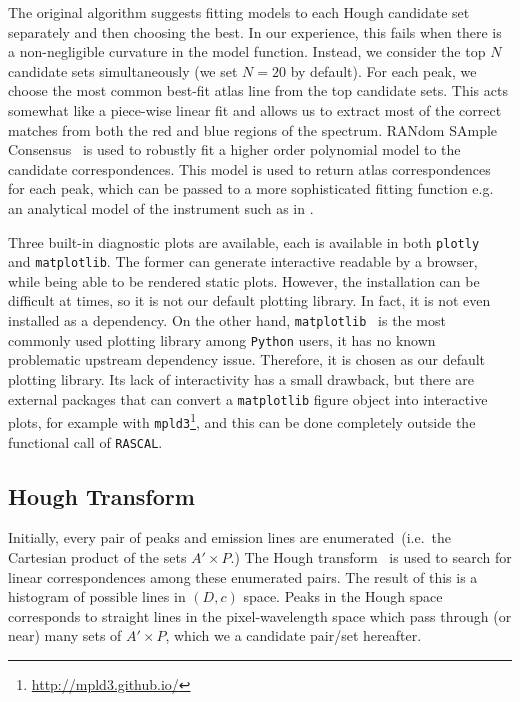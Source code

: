\documentclass{aa}
\begin{document}
The original algorithm suggests fitting models to each Hough candidate set separately
and then choosing the best. In our experience, this fails when there is a non-negligible
curvature in the model function. Instead, we consider the top $N$ candidate sets
simultaneously (we set $N = 20$ by default). For each peak, we choose the most common
best-fit atlas line from the top candidate sets. This acts somewhat like a piece-wise
linear fit and allows us to extract most of the correct matches from both the red and
blue regions of the spectrum. RANdom SAmple
Consensus~\citep[RANSAC][]{fischler_bolles_1981} is used to robustly fit
a higher order polynomial model to the candidate correspondences. This model is used
to return atlas correspondences for each peak, which can be passed to a more
sophisticated fitting function e.g. an analytical model of the instrument such as
in \citet{2013OptEn..52a3603L}.

Three built-in diagnostic plots are available, each is available in both
\texttt{plotly}~\citep{plotly} and \texttt{matplotlib}. The former can generate interactive
readable by a browser, while being able to be rendered static plots. However,
the installation can be difficult at times, so it is not our default plotting
library. In fact, it is not even installed as a dependency. On the other hand,
\texttt{matplotlib}~\citep{Hunter:2007} is the most commonly used plotting library
among \texttt{Python} users, it has no known problematic upstream dependency issue.
Therefore, it is chosen as our default plotting library. Its lack of
interactivity has a small drawback, but there are external packages that can
convert a \texttt{matplotlib} figure object into interactive plots, for example
with \texttt{mpld3}\footnote{\url{http://mpld3.github.io/}}, and this can be done completely outside the functional call
of \texttt{RASCAL}.

\subsection{Hough Transform}
Initially, every pair of peaks and emission lines are enumerated~(i.e.\ the
Cartesian product of the sets $A' \times P$.) The Hough
transform~\citep{osti_4746348} is used to search for linear correspondences
among these enumerated pairs. The result of this is a histogram of possible lines
in $(D, c)$ space. Peaks in the Hough space corresponds to straight lines
in the pixel-wavelength space which pass through (or near) many sets of
$A' \times P$, which we a candidate pair/set hereafter.
\end{document}
